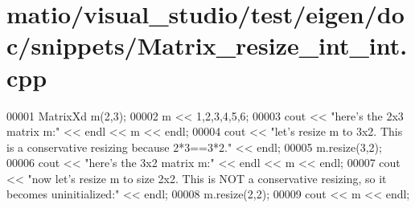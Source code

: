 \hypertarget{matio_2visual__studio_2test_2eigen_2doc_2snippets_2_matrix__resize__int__int_8cpp_source}{}\section{matio/visual\+\_\+studio/test/eigen/doc/snippets/\+Matrix\+\_\+resize\+\_\+int\+\_\+int.cpp}
\label{matio_2visual__studio_2test_2eigen_2doc_2snippets_2_matrix__resize__int__int_8cpp_source}

\begin{DoxyCode}
00001 MatrixXd m(2,3);
00002 m << 1,2,3,4,5,6;
00003 cout << \textcolor{stringliteral}{"here's the 2x3 matrix m:"} << endl << m << endl;
00004 cout << \textcolor{stringliteral}{"let's resize m to 3x2. This is a conservative resizing because 2*3==3*2."} << endl;
00005 m.resize(3,2);
00006 cout << \textcolor{stringliteral}{"here's the 3x2 matrix m:"} << endl << m << endl;
00007 cout << \textcolor{stringliteral}{"now let's resize m to size 2x2. This is NOT a conservative resizing, so it becomes uninitialized:"}
       << endl;
00008 m.resize(2,2);
00009 cout << m << endl;
\end{DoxyCode}
